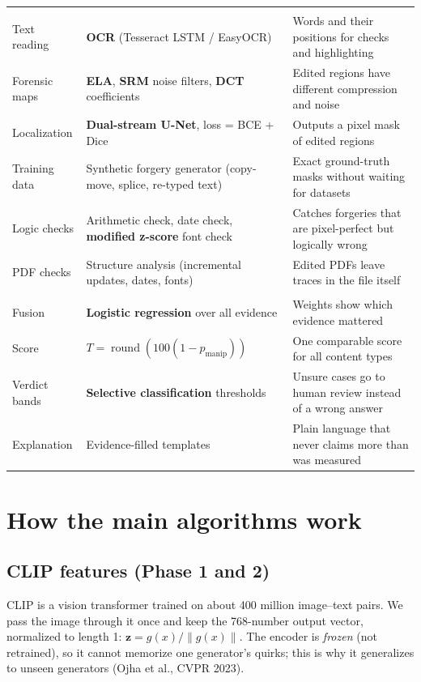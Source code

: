 \documentclass[11pt,a4paper]{article}
\begin{document}
\begin{center}
\begin{tabularx}{\linewidth}{@{}>{\raggedright\arraybackslash}p{2.3cm} >{\raggedright\arraybackslash}p{4.1cm} Y@{}}
\midrule
{} \\
Text reading & \textbf{OCR} (Tesseract LSTM / EasyOCR) & Words and their positions for checks and highlighting \\
Forensic maps & \textbf{ELA}, \textbf{SRM} noise filters, \textbf{DCT} coefficients & Edited regions have different compression and noise \\
Localization & \textbf{Dual-stream U-Net}, loss = BCE + Dice & Outputs a pixel mask of edited regions \\
Training data & Synthetic forgery generator (copy-move, splice, re-typed text) & Exact ground-truth masks without waiting for datasets \\
Logic checks & Arithmetic check, date check, \textbf{modified z-score} font check & Catches forgeries that are pixel-perfect but logically wrong \\
PDF checks & Structure analysis (incremental updates, dates, fonts) & Edited PDFs leave traces in the file itself \\
\midrule
{} \\
Fusion & \textbf{Logistic regression} over all evidence & Weights show which evidence mattered \\
Score & $T=\operatorname{round}(100(1-p_{\text{manip}}))$ & One comparable score for all content types \\
Verdict bands & \textbf{Selective classification} thresholds & Unsure cases go to human review instead of a wrong answer \\
Explanation & Evidence-filled templates & Plain language that never claims more than was measured \\
\bottomrule
\end{tabularx}
\end{center}

\section{How the main algorithms work}

\subsection*{CLIP features (Phase 1 and 2)}
CLIP is a vision transformer trained on about 400 million image--text pairs. We pass the image
through it once and keep the 768-number output vector, normalized to length 1:
$\mathbf{z}=g(x)/\lVert g(x)\rVert$. The encoder is \emph{frozen} (not retrained), so it cannot
memorize one generator's quirks; this is why it generalizes to unseen generators (Ojha et al., CVPR 2023).
\end{document}
